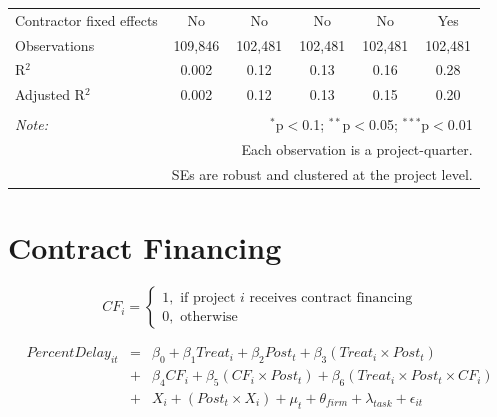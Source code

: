 \documentclass[
]{article}
\begin{document}
\begin{table}[H]
\begin{tabular}{@{\extracolsep{-2pt}}lccccc}
Contractor fixed effects & No & No & No & No & Yes \\ 
Observations & 109,846 & 102,481 & 102,481 & 102,481 & 102,481 \\ 
R$^{2}$ & 0.002 & 0.12 & 0.13 & 0.16 & 0.28 \\ 
Adjusted R$^{2}$ & 0.002 & 0.12 & 0.13 & 0.15 & 0.20 \\ 
\hline 
\hline \\[-1.8ex] 
\textit{Note:}  & \multicolumn{5}{r}{$^{*}$p$<$0.1; $^{**}$p$<$0.05; $^{***}$p$<$0.01} \\ 
 & \multicolumn{5}{r}{Each observation is a project-quarter.} \\ 
 & \multicolumn{5}{r}{SEs are robust and clustered at the project level.} \\ 
\end{tabular} 
\end{table}

\hypertarget{contract-financing}{%
\section{Contract Financing}\label{contract-financing}}

\[ CF_i = \begin{cases} 1, \text{ if project } i \text{ receives contract financing}\\
0, \text{ otherwise} \end{cases}\]

\[ \begin{aligned}
PercentDelay_{it} &=& \beta_0+\beta_1 Treat_i + \beta_2 Post_t + \beta_3 (Treat_i \times Post_t) \\
&+&\beta_4 CF_i + \beta_5 (CF_i \times Post_t) + \beta_6 (Treat_i \times Post_t \times CF_i) \\ 
&+&X_i + (Post_t \times X_i) + \mu_t + \theta_{firm} + \lambda_{task}+ \epsilon_{it}
\end{aligned}\]
\end{document}
